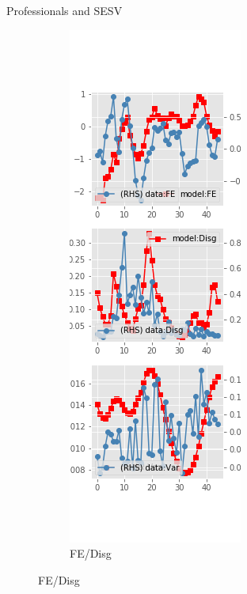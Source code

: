 \documentclass{beamer}
\begin{document}
\begin{frame}{Professionals and SESV}
\begin{figure}[ht]
\begin{subfigure}[b]{0.2\textwidth}
		\end{subfigure}
		\hfill
		\begin{subfigure}[b]{0.2\textwidth}
			\caption{FE/Disg}
			\includegraphics[width=\textwidth, height = 0.8\textheight]{figuresDraft/spf_se_est_sv_diag2.png}
		\end{subfigure}
	\end{figure}
\end{frame}
\end{document}
